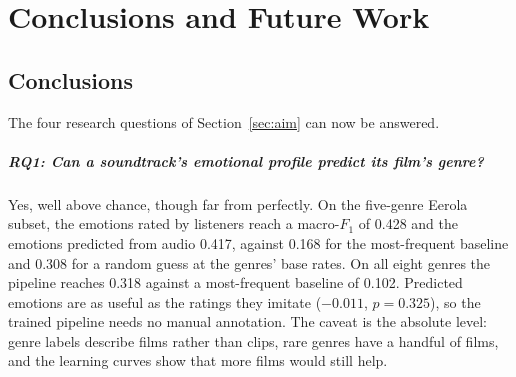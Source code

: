 
\chapter{Conclusions and Future Work}
\label{ch:conclusions}

\section{Conclusions}
\label{sec:conclusions}

The four research questions of Section~\ref{sec:aim} can now be answered.

\paragraph{RQ1: Can a soundtrack's emotional profile predict its film's genre?}
Yes, well above chance, though far from perfectly. On the five-genre Eerola subset, the
emotions rated by listeners reach a macro-$F_1$ of 0.428 and the emotions predicted from
audio 0.417, against 0.168 for the most-frequent baseline and 0.308 for a random guess at
the genres' base rates. On all eight genres the pipeline reaches 0.318 against a
most-frequent baseline of 0.102. Predicted emotions are as useful as the ratings they
imitate ($-0.011$, $p=0.325$), so the trained pipeline needs no manual annotation. The
caveat is the absolute level: genre labels describe films rather than clips, rare genres
have a handful of films, and the learning curves show that more films would still help.

